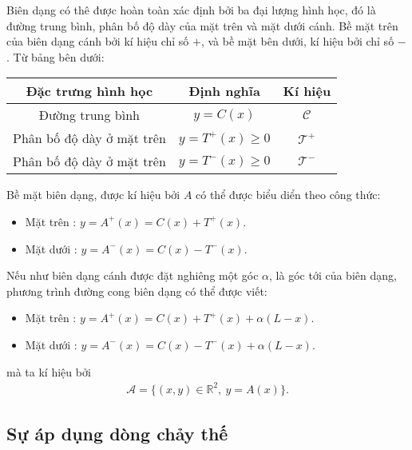 \documentclass[KHI_DONG_HOC.tex]{subfiles}
\begin{document}
	Biên dạng có thê được hoàn toàn xác định bởi ba đại lượng hình học, đó là đường trung bình, phân bố độ dày của mặt trên và mặt dưới cánh. Bề mặt trên của biên dạng cánh bởi kí hiệu chỉ số $+$, và bề mặt bên dưới, kí hiệu bởi chỉ số $-$. Từ bảng bên dưới:
	\begin{center}
		\begin{tabular}{||c|c|c||}
			\hline
			Đặc trưng hình học & Định nghĩa & Kí hiệu \\
			\hline
			\hline
			Đường trung bình & $y = C(x)$ & $\mathcal C$ \\
			\hline
			Phân bố độ dày ở mặt trên & $y = T^+(x)\ge0$ & $\mathcal T^+$ \\ 
			\hline
			Phân bố độ dày ở mặt trên & $y = T^-(x)\ge0$ & $\mathcal T^-$ \\
			\hline
		\end{tabular}
	\end{center}
	Bề mặt biên dạng, được kí hiệu bởi $A$ có thể được biểu diển theo công thức:
		\begin{itemize}
			\item Mặt trên : $y = A^+(x) = C(x)+T^+(x)$.
			\item Mặt dưới : $y = A^-(x) = C(x)-T^-(x)$.
		\end{itemize}
	Nếu như biên dạng cánh được đặt nghiêng một góc $\alpha$, là góc tới của biên dạng, phương trình đường cong biên dạng có thể được viết:
	\begin{itemize}
		\item Mặt trên : $y = A^+(x) = C(x)+T^+(x)+\alpha(L-x)$.
		\item Mặt dưới : $y = A^-(x) = C(x)-T^-(x)+\alpha(L-x)$.
	\end{itemize}
	mà ta kí hiệu bởi
	\begin{align}
		\mathcal A = \{(x,y)\in\mathbb R^2,\ y = A(x)\}.
	\end{align}
	
\subsection{Sự áp dụng dòng chảy thế}
\end{document}
